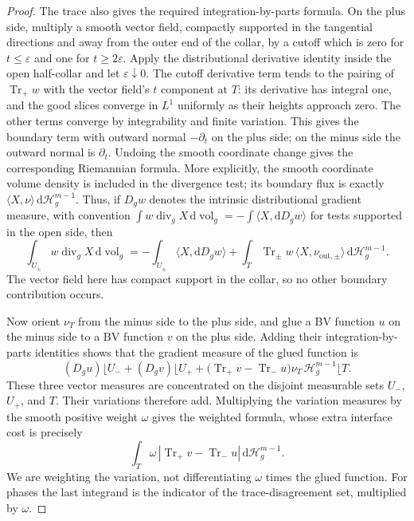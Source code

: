 \documentclass[11pt]{article}
\numberwithin{equation}{section}
\theoremstyle{definition}
\theoremstyle{remark}
\begin{document}
\begin{proof}
The trace also gives the required integration-by-parts formula.
On the plus side, multiply a smooth vector field, compactly supported
in the tangential directions and away from the outer end of the
collar, by a cutoff which is zero for $t\le\varepsilon$ and one for
$t\ge2\varepsilon$.
Apply the distributional derivative identity inside the open
half-collar and let $\varepsilon\downarrow0$.
The cutoff derivative term tends to the pairing of
$\operatorname{Tr}_+w$ with the vector field's $t$ component at $T$:
its derivative has integral one, and the good slices converge in
$L^1$ uniformly as their heights approach zero.
The other terms converge by integrability and finite variation.
This gives the boundary term with outward normal $-\partial_t$ on
the plus side; on the minus side the outward normal is $\partial_t$.
Undoing the smooth coordinate change gives the corresponding
Riemannian formula.  More explicitly, the smooth coordinate volume
density is included in the divergence test; its boundary flux is
exactly $\langle X,\nu\rangle\,\mathrm d\mathcal H_g^{m-1}$.
Thus, if $D_g w$ denotes the intrinsic distributional gradient measure,
with convention
$\int w\operatorname{div}_g X\,\mathrm d\operatorname{vol}_g=-\int\langle X,\mathrm d D_g w\rangle$
for tests supported in the open side, then
\[
 \int_{U_\pm}w\operatorname{div}_g X\,\mathrm d\operatorname{vol}_g
 =-\int_{U_\pm}\langle X,\mathrm d D_g w\rangle
   +\int_T\operatorname{Tr}_\pm w\,
                   \langle X,\nu_{\mathrm{out},\pm}\rangle
                         \,\mathrm d\mathcal H_g^{m-1}.
\]
The vector field here has compact support in the collar, so no other
boundary contribution occurs.

Now orient $\nu_T$ from the minus side to the plus side, and glue a BV
function $u$ on the minus side to a BV function $v$ on the plus side.
Adding their integration-by-parts identities shows that the gradient
measure of the glued function is
\[
 (D_g u)\lfloor U_-+(D_g v)\lfloor U_+
 +\bigl(\operatorname{Tr}_+v-\operatorname{Tr}_-u\bigr)
                  \nu_T\,\mathcal H_g^{m-1}\lfloor T.
\]
These three vector measures are concentrated on the disjoint
measurable sets $U_-$, $U_+$, and $T$.  Their variations therefore
add.  Multiplying the variation measures by the smooth positive
weight $\omega$ gives the weighted formula, whose extra interface
cost is precisely
\[
 \int_T\omega\,
       |\operatorname{Tr}_+v-\operatorname{Tr}_-u|
                         \,\mathrm d\mathcal H_g^{m-1}.
\]
We are weighting the variation, not differentiating $\omega$ times
the glued function.  For phases the last integrand is the indicator
of the trace-disagreement set, multiplied by $\omega$.


\end{proof}
\end{document}

